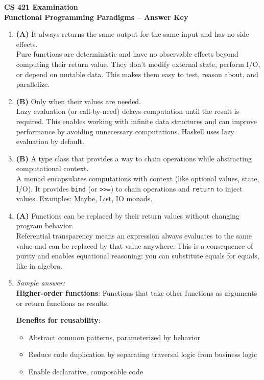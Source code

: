 \documentclass[11pt]{article}
\begin{document}
\begin{center}
  {\Large \textbf{CS 421 Examination}}\\[0.25em]
  {\large \textbf{Functional Programming Paradigms -- Answer Key}}\\[0.5em]
\end{center}

\begin{enumerate}[label=\textbf{\arabic*.}]

  \item \textbf{(A)} It always returns the same output for the same input and has no side effects.\\
  Pure functions are deterministic and have no observable effects beyond computing their return value. 
  They don't modify external state, perform I/O, or depend on mutable data. This makes them easy to 
  test, reason about, and parallelize.

  \item \textbf{(B)} Only when their values are needed.\\
  Lazy evaluation (or call-by-need) delays computation until the result is required. This enables 
  working with infinite data structures and can improve performance by avoiding unnecessary computations. 
  Haskell uses lazy evaluation by default.

  \item \textbf{(B)} A type class that provides a way to chain operations while abstracting computational 
  context.\\
  A monad encapsulates computations with context (like optional values, state, I/O). It provides 
  \texttt{bind} (or \texttt{>>=}) to chain operations and \texttt{return} to inject values. Examples: 
  Maybe, List, IO monads.

  \item \textbf{(A)} Functions can be replaced by their return values without changing program behavior.\\
  Referential transparency means an expression always evaluates to the same value and can be replaced 
  by that value anywhere. This is a consequence of purity and enables equational reasoning: you can 
  substitute equals for equals, like in algebra.

  \item \emph{Sample answer:}\\
  \textbf{Higher-order functions}: Functions that take other functions as arguments or return 
  functions as results.

  \textbf{Benefits for reusability}:
  \begin{itemize}
    \item Abstract common patterns, parameterized by behavior
    \item Reduce code duplication by separating traversal logic from business logic
    \item Enable declarative, composable code
  \end{itemize}


\end{enumerate}
\end{document}
